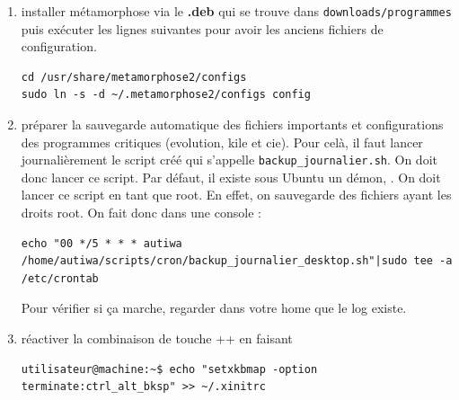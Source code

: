 \documentclass[a4paper,twoside]{article}
\begin{document}
\begin{enumerate}
\item installer métamorphose via le \textbf{.deb} qui se trouve dans \texttt{downloads/programmes} puis exécuter les lignes suivantes pour avoir les anciens fichiers de configuration.
\begin{verbatim}
cd /usr/share/metamorphose2/configs
sudo ln -s -d ~/.metamorphose2/configs config
\end{verbatim}
\item préparer la sauvegarde automatique des fichiers importants et configurations des programmes critiques (evolution, kile et cie). Pour celà, il faut lancer journalièrement le script créé qui s'appelle \texttt{backup\_journalier.sh}. On doit donc lancer ce script. Par défaut, il existe sous Ubuntu un démon, . On doit lancer ce script en tant que root. En effet, on sauvegarde des fichiers ayant les droits root. On fait donc dans une console :

%

\begin{verbatim}
echo "00 */5 * * * autiwa /home/autiwa/scripts/cron/backup_journalier_desktop.sh"|sudo tee -a /etc/crontab
\end{verbatim}


\begin{remarque}
Pour vérifier si ça marche, regarder dans votre home que le log existe.
\end{remarque}

\item réactiver la combinaison de touche ++ en faisant
\begin{verbatim}
utilisateur@machine:~$ echo "setxkbmap -option terminate:ctrl_alt_bksp" >> ~/.xinitrc
\end{verbatim}


\end{enumerate}
\end{document}
